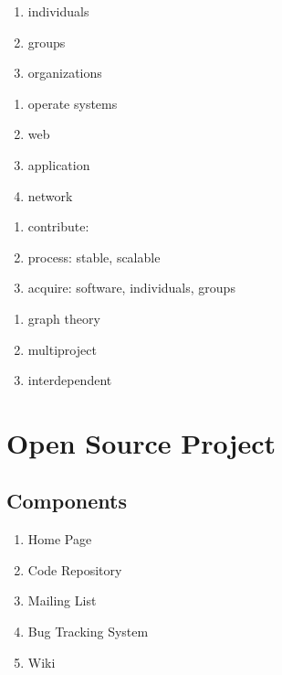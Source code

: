 \documentclass[draftclsnofoot,journal,onecolumn,12pt]{IEEEtran}
\begin{document}
\begin{enumerate}
  \item individuals
  \item groups
  \item organizations
\end{enumerate}

\begin{enumerate}
  \item operate systems
  \item web
  \item application
  \item network
\end{enumerate}

\begin{enumerate}
  \item contribute:
  \item process: stable, scalable
  \item acquire: software, individuals, groups
\end{enumerate}

\begin{enumerate}
  \item graph theory
  \item multiproject
  \item interdependent
\end{enumerate}

\section{Open Source Project}

\subsection{Components}
\begin{enumerate}
  \item Home Page
  \item Code Repository
  \item Mailing List
  \item Bug Tracking System
  \item Wiki
\end{enumerate}
\end{document}
